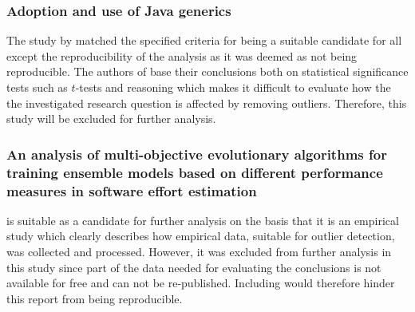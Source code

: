 \subsubsection{Adoption and use of Java generics}
The study by \citet{parnin2013adoption} matched the specified criteria for being a suitable candidate for all except the reproducibility of the analysis as it was deemed as not being reproducible. The authors of \citet{parnin2013adoption} base their conclusions both on statistical significance tests such as $t$-tests and reasoning which makes it difficult to evaluate how the the investigated research question is affected by removing outliers. Therefore, this study will be excluded for further analysis.


\subsubsection{An analysis of multi-objective evolutionary algorithms for training ensemble models based on different performance measures in software effort estimation}
\citet{minku2013analysis} is suitable as a candidate for further analysis on the basis that it is an empirical study which clearly describes how empirical data, suitable for outlier detection, was collected and processed. However, it was excluded from further analysis in this study since part of the data needed for evaluating the conclusions is not available for free and can not be re-published. Including \citet{minku2013analysis} would therefore hinder this report from being reproducible.
